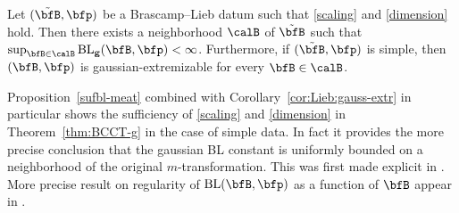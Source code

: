 \begin{proposition}\label{sufbl-meat}
Let $(\tilde{\bfB},\p)$ be a Brascamp--Lieb datum such that \eqref{scaling} and \eqref{dimension} hold.
Then there exists a neighborhood $\calB$ of $\tilde{\bfB}$ such that $\sup_{\bfB \in \calB} \BLg(\bfB,\p) < \infty$.
Furthermore, if $(\tilde{\bfB},\p)$ is simple, then $(\bfB,\p)$ is gaussian-extremizable for every $\bfB \in \calB$.
\end{proposition}

Proposition~\ref{sufbl-meat} combined with Corollary~\ref{cor:Lieb:gauss-extr} in particular shows the sufficiency of \eqref{scaling} and \eqref{dimension} in Theorem~\ref{thm:BCCT-g} in the case of simple data.
In fact it provides the more precise conclusion that the gaussian BL constant is uniformly bounded on a neighborhood of the original $m$-transformation.
This was first made explicit in \cite{MR3783217}.
More precise result on regularity of $\BL(\bfB,\p)$ as a function of $\bfB$ appear in \cite{MR2836590,MR3723636,arxiv:1811.11052}.

